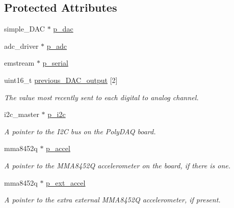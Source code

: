 \subsection*{Protected Attributes}
\begin{DoxyCompactItemize}
\item 
simple\-\_\-\-D\-A\-C $\ast$ \hyperlink{classpolydaq2_a073eef7409f849444cecfdfd862be831}{p\-\_\-dac}
\item 
adc\-\_\-driver $\ast$ \hyperlink{classpolydaq2_a3b12ada80e0c2fbf7608e6b804c4bb2b}{p\-\_\-adc}
\item 
emstream $\ast$ \hyperlink{classpolydaq2_a08c9b43abd6589c0981eddd3d8a87ba9}{p\-\_\-serial}
\item 
\hypertarget{classpolydaq2_a29d5cd87fbe8d5f5092225260cbefe9c}{uint16\-\_\-t \hyperlink{classpolydaq2_a29d5cd87fbe8d5f5092225260cbefe9c}{previous\-\_\-\-D\-A\-C\-\_\-output} \mbox{[}2\mbox{]}}\label{classpolydaq2_a29d5cd87fbe8d5f5092225260cbefe9c}

\begin{DoxyCompactList}\small\item\em The value most recently sent to each digital to analog channel. \end{DoxyCompactList}\item 
\hypertarget{classpolydaq2_abf5920486e0d72f42506220a5ba38082}{i2c\-\_\-master $\ast$ \hyperlink{classpolydaq2_abf5920486e0d72f42506220a5ba38082}{p\-\_\-i2c}}\label{classpolydaq2_abf5920486e0d72f42506220a5ba38082}

\begin{DoxyCompactList}\small\item\em A pointer to the I2\-C bus on the Poly\-D\-A\-Q board. \end{DoxyCompactList}\item 
\hypertarget{classpolydaq2_a85ba73b5f25017de468d41790dc78579}{mma8452q $\ast$ \hyperlink{classpolydaq2_a85ba73b5f25017de468d41790dc78579}{p\-\_\-accel}}\label{classpolydaq2_a85ba73b5f25017de468d41790dc78579}

\begin{DoxyCompactList}\small\item\em A pointer to the M\-M\-A8452\-Q accelerometer on the board, if there is one. \end{DoxyCompactList}\item 
\hypertarget{classpolydaq2_a2e71a76cf6b209fa6abcf0a3d984ce41}{mma8452q $\ast$ \hyperlink{classpolydaq2_a2e71a76cf6b209fa6abcf0a3d984ce41}{p\-\_\-ext\-\_\-accel}}\label{classpolydaq2_a2e71a76cf6b209fa6abcf0a3d984ce41}

\begin{DoxyCompactList}\small\item\em A pointer to the extra external M\-M\-A8452\-Q accelerometer, if present. \end{DoxyCompactList}\end{DoxyCompactItemize}


